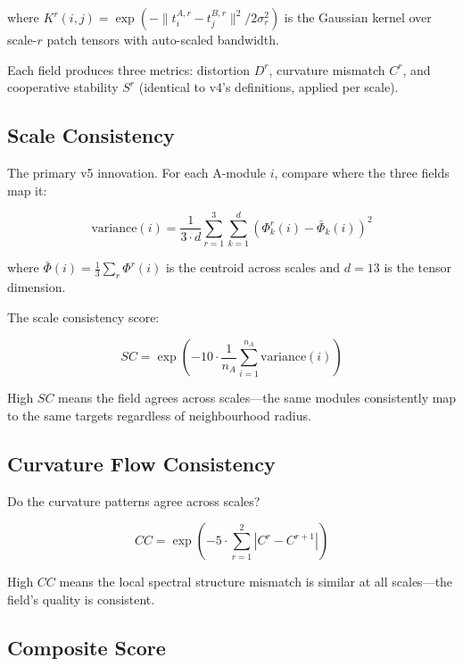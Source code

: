 \documentclass{../yalumba}
\begin{document}
where $K^r(i,j) = \exp(-\|t_i^{A,r} - t_j^{B,r}\|^2 / 2\sigma_r^2)$ is
the Gaussian kernel over scale-$r$ patch tensors with auto-scaled bandwidth.

Each field produces three metrics: distortion $D^r$, curvature mismatch
$C^r$, and cooperative stability $S^r$ (identical to v4's definitions,
applied per scale).

\subsection{Scale Consistency}

The primary v5 innovation.  For each A-module $i$, compare where the three
fields map it:

\begin{equation}
  \text{variance}(i) = \frac{1}{3 \cdot d} \sum_{r=1}^{3} \sum_{k=1}^{d}
    \left(\Phi^r_k(i) - \bar{\Phi}_k(i)\right)^2
  \label{eq:variance}
\end{equation}

where $\bar{\Phi}(i) = \frac{1}{3}\sum_r \Phi^r(i)$ is the centroid across
scales and $d = 13$ is the tensor dimension.

The scale consistency score:

\begin{equation}
  SC = \exp\!\left(-10 \cdot \frac{1}{n_A} \sum_{i=1}^{n_A} \text{variance}(i)\right)
  \label{eq:sc}
\end{equation}

High $SC$ means the field agrees across scales---the same modules consistently
map to the same targets regardless of neighbourhood radius.

\subsection{Curvature Flow Consistency}

Do the curvature patterns agree across scales?

\begin{equation}
  CC = \exp\!\left(-5 \cdot \sum_{r=1}^{2} |C^r - C^{r+1}|\right)
  \label{eq:cc}
\end{equation}

High $CC$ means the local spectral structure mismatch is similar at all
scales---the field's quality is consistent.

\subsection{Composite Score}
\end{document}
